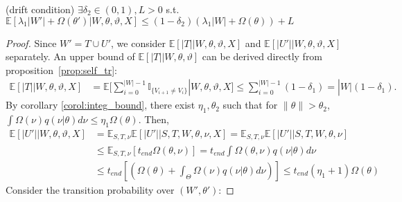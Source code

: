 \begin{lemma}(drift condition) $\exists \delta_2 \in (0, 1), L > 0$
  s.t.
  $\mathbb{E}\left[\lambda_1|W'| + \Omega(\theta')  | W, \theta, \vartheta, X\right]
  \leq (1 - \delta_2)\left(\lambda_1|W| + \Omega(\theta)   \right) + L$ %
\label{lem:drift}
\end{lemma}
\begin{proof}
Since $W'=T\cup U'$, we consider $\mathbb{E}[|T| |W,\theta,\vartheta,X]$
and $\mathbb{E}[|U'| | W, \theta, \vartheta, X]$ separately.
An upper bound of $\mathbb{E}[|T| | W,\theta,\vartheta]$ can be derived
directly from proposition~\ref{prop:self_tr}:
\begin{align*}
\mathbb{E}[|T| |W,\theta,\vartheta,X] &= \mathbb{E}[\sum_{i = 0}^{|W|-1}
  \mathbb{I}_{\{ V_{i + 1} \neq V_i \}}| W, \theta, \vartheta, X]
\leq \sum_{i = 0}^{|W| - 1} (1 - \delta_1) = |W|(1 - \delta_1).
\end{align*}
By corollary \ref{corol:integ_bound}, there exist $\eta_1 , \theta_2$ such that for 
$ \| \theta \| > \theta_2$, 
 $ \int \Omega(\nu) q(\nu | \theta)d\nu \leq \eta_1 \Omega(\theta) 
 $. Then,
\begin{align*}
\mathbb{E}[|U'| |W, \theta, \vartheta, X] &= \mathbb{E}_{S,T, \nu}\mathbb{E}[|U'| | S, T, W, \theta, \nu, X] = \mathbb{E}_{S,T, \nu}\mathbb{E}[|U'| | S, T, W, \theta, \nu] \\
& \leq \mathbb{E}_{S,T, \nu} \left[t_{end}\Omega(\theta, \nu)\right] = t_{end}\int \Omega(\theta, \nu) q(\nu | \theta) d\nu\\
& \leq t_{end} \left[ \left(  \Omega(\theta) +
\int_\Theta \Omega(\nu) q(\nu | \theta)d\nu \right) \right] 
 \leq t_{end} (\eta_1 + 1) \Omega(\theta) %
\end{align*}
Consider the transition probability over $(W',\theta')$:

\end{proof}
